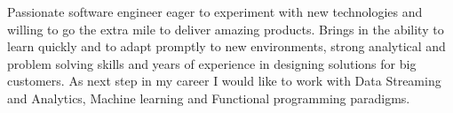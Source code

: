 
\begin{cvparagraph}

Passionate software engineer eager to experiment with new technologies and willing to go the extra mile to deliver amazing products.
Brings in the ability to learn quickly and to adapt promptly to new environments, strong analytical and problem solving skills and years of experience in designing solutions for big customers.
As next step in my career I would like to work with Data Streaming and Analytics, Machine learning and Functional programming paradigms.
\end{cvparagraph}
